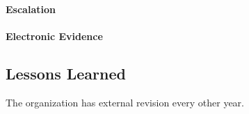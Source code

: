 \paragraph{Escalation}
\paragraph{Electronic Evidence}

\subsection{Lessons Learned}
The organization has external revision every other year.
